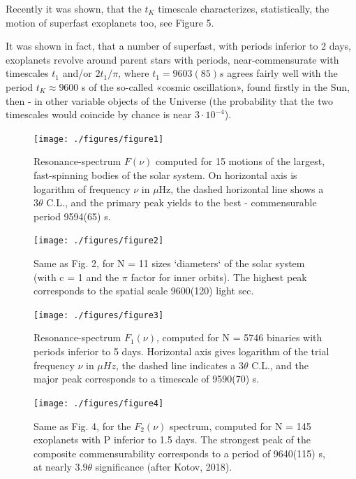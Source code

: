 \documentclass[twoside,draft]{article}
\begin{document}
\begin{sloppypar}
Recently it was shown, that the $t_K$ timescale characterizes, statistically, the motion of superfast exoplanets too, see Figure 5.

It was shown in fact, that a number of superfast, with periods inferior to 2 days, exoplanets revolve around parent stars with periods, near-commensurate with timescales $t_{1}$ and/or $2 t_{1}/\pi$, where $t_{1} = 9603(85) s$ agrees fairly well with the period $t_{K} \approx 9600$ s of the so-called «cosmic oscillation», found firstly in the Sun, then - in other variable objects of the Universe (the probability that the two timescales would coincide by chance is near $3 \cdot 10^{-4}$).

\begin{figure}
\centering
\texttt{[image: ./figures/figure1]}
\caption{Resonance-spectrum $F(\nu)$ computed for 15 motions of the largest, fast-spinning bodies of the solar system. On horizontal axis is logarithm of frequency $\nu$ in $\mu$Hz, the dashed horizontal line shows a $ 3 \theta $ C.L., and the primary peak yields to the best - commensurable period 9594(65) s.}
\label{fig:figure_label}
\end{figure}

\begin{figure}
\centering
\texttt{[image: ./figures/figure2]}
\caption{Same as Fig. 2, for N = 11 sizes `diameters` of the solar system (with c = 1 and the $\pi$ factor for inner orbits). The highest peak corresponds to the spatial scale 9600(120) light sec.}
\label{fig:figure_label}
\end{figure}

\begin{figure}
\centering
\texttt{[image: ./figures/figure3]}
\caption{Resonance-spectrum $F_{1} ( \nu)$, computed for N = 5746 binaries with periods inferior to 5 days. Horizontal axis gives logarithm of the trial frequency $\nu$ in $\mu Hz$, the dashed line indicates a $3 \theta$ C.L., and the major peak corresponds to a timescale of 9590(70) s.}
\label{fig:figure_label}
\end{figure}

\begin{figure}
\centering
\texttt{[image: ./figures/figure4]}
\caption{Same as Fig. 4, for the $F_{2} ( \nu )$ spectrum, computed for N = 145 exoplanets with P inferior to 1.5 days. The strongest peak of the composite commensurability corresponds to a period of 9640(115) s, at nearly $3.9\theta$ significance (after Kotov, 2018).}
\label{fig:figure_label}
\end{figure}


\end{sloppypar}
\end{document}
